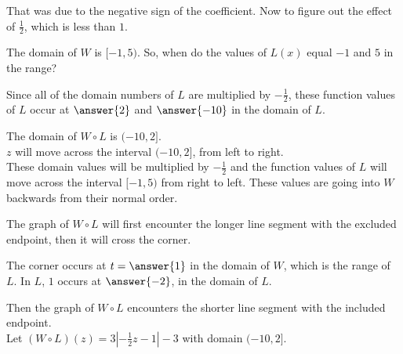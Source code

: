 \documentclass{ximera}
\begin{document}
That was due to the negative sign of the coefficient.  Now to figure out the effect of $\frac{1}{2}$, which is less than $1$.


The domain of $W$ is $[-1, 5)$.  So, when do the values of $L(x)$ equal $-1$ and $5$ in the range?  



\begin{question}

Since all of the domain numbers of $L$ are multiplied by $-\frac{1}{2}$, these function values of $L$ occur at $\answer{2}$ and $\answer{-10}$ in the domain of $L$. \\

\end{question}


The domain of $W \circ L$ is $(-10, 2]$. \\



$z$ will move across the interval $(-10, 2]$, from left to right.  \\

These domain values will be multiplied by $-\frac{1}{2}$ and the function values of $L$ will move across the interval $[-1, 5)$ from right to left.  These values are going into $W$ backwards from their normal order.

The graph of $W \circ L$ will first encounter the longer line segment with the excluded endpoint, then it will cross the corner.  

\begin{question}

The corner occurs at $ t = \answer{1}$ in the domain of $W$, which is the range of $L$. In $L$, $1$ occurs at $\answer{-2}$, in the domain of $L$.  \\

\end{question}

Then the graph of $W \circ L$ encounters the shorter line segment with the included endpoint. \\





Let $(W \circ L)(z) = 3 |-\frac{1}{2}z-1| - 3$ with domain $(-10, 2]$.
\end{document}
